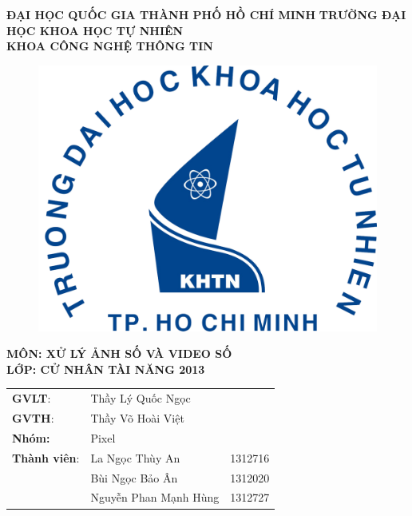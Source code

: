 \documentclass{article}
\begin{document}
\begin{titlepage}
\begin{center}
		\large{\textbf{ĐẠI HỌC QUỐC GIA THÀNH PHỐ HỒ CHÍ MINH}}
		\large{\textbf{TRƯỜNG ĐẠI HỌC KHOA HỌC TỰ NHIÊN}}\\
		\large{\textbf{KHOA CÔNG NGHỆ THÔNG TIN}}\\
	
	\begin{figure}[H]
		\centerline{\includegraphics[scale = 0.5]{logo}}
	\end{figure}
	\vfill
	
	\large{\textbf{MÔN: XỬ LÝ ẢNH SỐ VÀ VIDEO SỐ}}\\
	\large{\textbf{LỚP: CỬ NHÂN TÀI NĂNG 2013}}\\
\end{center}
	\vfill

	\vfill
	
\begin{flushright}
	\begin{tabular}{l l l}
		\textbf{GVLT}: & Thầy Lý Quốc Ngọc\\
		\textbf{GVTH}: & Thầy Võ Hoài Việt\\
		\textbf{Nhóm:} & Pixel\\
		\textbf{Thành viên}: & La Ngọc Thùy An & 1312716\\
		& Bùi Ngọc Bảo Ân & 1312020\\
		& Nguyễn Phan Mạnh Hùng & 1312727\\
	\end{tabular}
\end{flushright}
\end{titlepage}
\pagebreak
\end{document}
